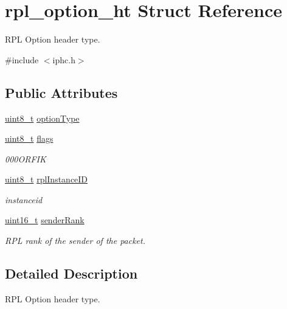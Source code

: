 \hypertarget{structrpl__option__ht}{}\section{rpl\+\_\+option\+\_\+ht Struct Reference}
\label{structrpl__option__ht}


R\+PL Option header type.  




{\ttfamily \#include $<$iphc.\+h$>$}

\subsection*{Public Attributes}
\begin{DoxyCompactItemize}
\item 
\hyperlink{_p_e___types_8h_aba7bc1797add20fe3efdf37ced1182c5}{uint8\+\_\+t} \hyperlink{structrpl__option__ht_a6c8c2bdc4432ae3e2a013fb727ada959}{option\+Type}
\item 
\hyperlink{_p_e___types_8h_aba7bc1797add20fe3efdf37ced1182c5}{uint8\+\_\+t} \hyperlink{structrpl__option__ht_a6427b5529b4ca8f086e1893a1c83a614}{flags}
\begin{DoxyCompactList}\small\item\em 000\+O\+R\+F\+IK \end{DoxyCompactList}\item 
\hyperlink{_p_e___types_8h_aba7bc1797add20fe3efdf37ced1182c5}{uint8\+\_\+t} \hyperlink{structrpl__option__ht_a3888e0a293a042fb8f9db203ad4ce462}{rpl\+Instance\+ID}
\begin{DoxyCompactList}\small\item\em instanceid \end{DoxyCompactList}\item 
\hyperlink{_p_e___types_8h_a1f1825b69244eb3ad2c7165ddc99c956}{uint16\+\_\+t} \hyperlink{structrpl__option__ht_afef2aed4e368e0b68c8e9337f0ea1723}{sender\+Rank}
\begin{DoxyCompactList}\small\item\em R\+PL rank of the sender of the packet. \end{DoxyCompactList}\end{DoxyCompactItemize}


\subsection{Detailed Description}
R\+PL Option header type. 

